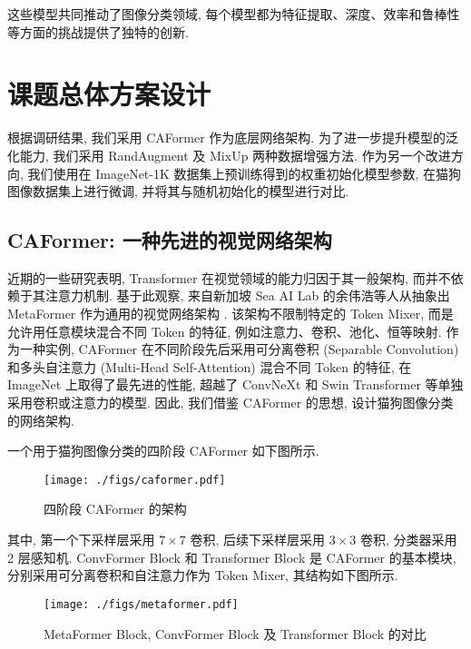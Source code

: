 \documentclass[12pt,a4paper]{article}
\begin{document}
\bigskip

这些模型共同推动了图像分类领域, 每个模型都为特征提取、深度、效率和鲁棒性等方面的挑战提供了独特的创新.

\section{课题总体方案设计}

根据调研结果, 我们采用 CAFormer \cite{yu_metaformer_2024} 作为底层网络架构. 为了进一步提升模型的泛化能力, 我们采用 RandAugment \cite{cubuk_randaugment_2019} 及 MixUp \cite{zhang_mixup_2018} 两种数据增强方法. 作为另一个改进方向, 我们使用在 ImageNet-1K 数据集上预训练得到的权重初始化模型参数, 在猫狗图像数据集上进行微调, 并将其与随机初始化的模型进行对比.

\subsection{CAFormer: 一种先进的视觉网络架构}

近期的一些研究表明, Transformer 在视觉领域的能力归因于其一般架构, 而并不依赖于其注意力机制. 基于此观察, 来自新加坡 Sea AI Lab 的余伟浩等人从抽象出 MetaFormer 作为通用的视觉网络架构 \cite{yu_metaformer_2022}. 该架构不限制特定的 Token Mixer, 而是允许用任意模块混合不同 Token 的特征, 例如注意力、卷积、池化、恒等映射. 作为一种实例, CAFormer 在不同阶段先后采用可分离卷积 (Separable Convolution) 和多头自注意力 (Multi-Head Self-Attention) 混合不同 Token 的特征, 在 ImageNet 上取得了最先进的性能, 超越了 ConvNeXt 和 Swin Transformer 等单独采用卷积或注意力的模型. 因此, 我们借鉴 CAFormer 的思想, 设计猫狗图像分类的网络架构.

一个用于猫狗图像分类的四阶段 CAFormer 如下图所示.

\begin{figure}[htbp]
    \centering
    \texttt{[image: ./figs/caformer.pdf]}
    \caption{四阶段 CAFormer 的架构}
\end{figure}

其中, 第一个下采样层采用 $7\times 7$ 卷积, 后续下采样层采用 $3\times 3$ 卷积, 分类器采用 2 层感知机. ConvFormer Block 和 Transformer Block 是 CAFormer 的基本模块, 分别采用可分离卷积和自注意力作为 Token Mixer, 其结构如下图所示.

\begin{figure}[htbp]
    \centering
    \texttt{[image: ./figs/metaformer.pdf]}
    \caption{MetaFormer Block, ConvFormer Block 及 Transformer Block 的对比}
\end{figure}
\end{document}
